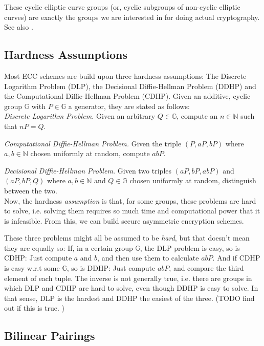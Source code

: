 These cyclic elliptic curve groups (or, cyclic subgroups of non-cyclic elliptic curves) are exactly the groups we are interested in for doing actual cryptography. See also \cite[p.~321]{katz_introduction_2015}.

\subsection{Hardness Assumptions}

Most ECC schemes are build upon three hardness assumptions: The Discrete Logarithm Problem (DLP), the Decisional Diffie-Hellman Problem (DDHP) and the Computational Diffie-Hellman Problem (CDHP).
Given an additive, cyclic group $\mathbb{G}$ with $P \in \mathbb{G}$ a generator, they are stated as follows:
\\

\emph{Discrete Logarithm Problem.} Given an arbitrary $Q \in \mathbb{G}$, compute an $n \in \mathbb{N}$ such that $n P = Q$. %

\emph{Computational Diffie-Hellman Problem.} Given the triple $(P, aP, bP)$ where $a, b \in \mathbb{N}$ chosen uniformly at random, compute $abP$.

\emph{Decisional Diffie-Hellman Problem.} Given two triples $(aP, bP, abP)$ and $(aP, bP, Q)$ where $a, b \in \mathbb{N}$ and $Q \in \mathbb{G}$ chosen uniformly at random, distinguish between the two.
\\

Now, the hardness \emph{assumption} is that, for some groups, these problems are hard to solve, i.e. solving them requires so much time and computational power that it is infeasible.
From this, we can build secure asymmetric encryption schemes.

These three problems might all be assumed to be \emph{hard}, but that doesn't mean they are equally so:
If, in a certain group $\mathbb{G}$, the DLP problem is easy, so is CDHP: Just compute $a$ and $b$, and then use them to calculate $abP$.
And if CDHP is easy w.r.t some $\mathbb{G}$, so is DDHP: Just compute $abP$, and compare the third element of each tuple.
The inverse is not generally true, i.e. there are groups in which DLP and CDHP are hard to solve, even though DDHP is easy to solve.
In that sense, DLP is the hardest and DDHP the easiest of the three. \cite{katz_introduction_2015} (TODO find out if this is true. \cite{menezes_introduction_2009})

\subsection{Bilinear Pairings}
